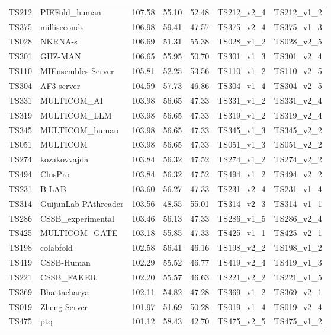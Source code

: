 \begin{longtable}{lllllll}
TS212 & PIEFold\_human & 107.58 & 55.10 & 52.48 & TS212\_v2\_4 & TS212\_v1\_2 \\ 
TS375 & milliseconds & 106.98 & 59.41 & 47.57 & TS375\_v2\_4 & TS375\_v1\_3 \\ 
TS028 & NKRNA-s & 106.69 & 51.31 & 55.38 & TS028\_v1\_2 & TS028\_v2\_5 \\ 
TS301 & GHZ-MAN & 106.65 & 55.95 & 50.70 & TS301\_v1\_3 & TS301\_v2\_4 \\ 
TS110 & MIEnsembles-Server & 105.81 & 52.25 & 53.56 & TS110\_v1\_2 & TS110\_v2\_5 \\ 
TS304 & AF3-server & 104.59 & 57.73 & 46.86 & TS304\_v1\_4 & TS304\_v2\_5 \\ 
TS331 & MULTICOM\_AI & 103.98 & 56.65 & 47.33 & TS331\_v1\_2 & TS331\_v2\_4 \\ 
TS319 & MULTICOM\_LLM & 103.98 & 56.65 & 47.33 & TS319\_v1\_2 & TS319\_v2\_4 \\ 
TS345 & MULTICOM\_human & 103.98 & 56.65 & 47.33 & TS345\_v1\_3 & TS345\_v2\_2 \\ 
TS051 & MULTICOM & 103.98 & 56.65 & 47.33 & TS051\_v1\_3 & TS051\_v2\_2 \\ 
TS274 & kozakovvajda & 103.84 & 56.32 & 47.52 & TS274\_v1\_2 & TS274\_v2\_2 \\ 
TS494 & ClusPro & 103.84 & 56.32 & 47.52 & TS494\_v1\_2 & TS494\_v2\_2 \\ 
TS231 & B-LAB & 103.60 & 56.27 & 47.33 & TS231\_v2\_4 & TS231\_v1\_4 \\ 
TS314 & GuijunLab-PAthreader & 103.56 & 48.55 & 55.01 & TS314\_v2\_3 & TS314\_v1\_1 \\ 
TS286 & CSSB\_experimental & 103.46 & 56.13 & 47.33 & TS286\_v1\_5 & TS286\_v2\_4 \\ 
TS425 & MULTICOM\_GATE & 103.18 & 55.85 & 47.33 & TS425\_v1\_1 & TS425\_v2\_1 \\ 
TS198 & colabfold & 102.58 & 56.41 & 46.16 & TS198\_v2\_2 & TS198\_v1\_2 \\ 
TS419 & CSSB-Human & 102.29 & 55.52 & 46.77 & TS419\_v2\_4 & TS419\_v1\_3 \\ 
TS221 & CSSB\_FAKER & 102.20 & 55.57 & 46.63 & TS221\_v2\_2 & TS221\_v1\_5 \\ 
TS369 & Bhattacharya & 102.11 & 54.82 & 47.28 & TS369\_v1\_2 & TS369\_v2\_1 \\ 
TS019 & Zheng-Server & 101.97 & 51.69 & 50.28 & TS019\_v1\_4 & TS019\_v2\_4 \\ 
TS475 & ptq & 101.12 & 58.43 & 42.70 & TS475\_v2\_5 & TS475\_v1\_2 \\ 

\end{longtable}
